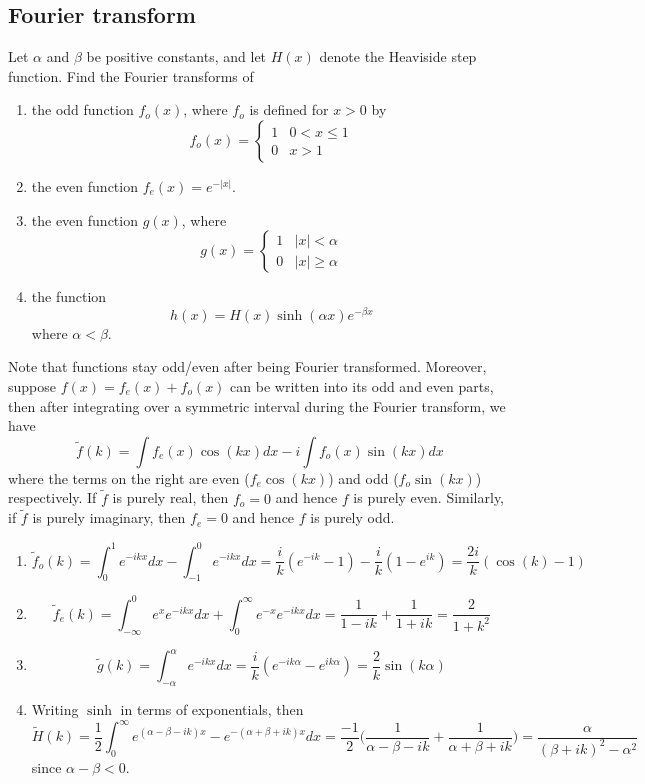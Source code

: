 \documentclass[a4paper]{article}
\begin{document}
\subsection*{Fourier transform}
\begin{qns}
Let $\alpha$ and $\beta$ be positive constants, and let $H(x)$ denote the Heaviside step function. Find the Fourier transforms of 
\begin{enumerate}[label=(\alph*)]
    \item the odd function $f_o(x)$, where $f_o$ is defined for $x>0$ by 
    $$f_o(x)=
\left\{
        \begin{array}{ll}
      1 & 0< x\leq 1 \\
      0 & x>1 
        \end{array}
    \right.$$
    \item the even function $f_e(x)=e^{-|x|}$.
    \item the even function $g(x)$, where
    $$g(x)=
\left\{
        \begin{array}{ll}
      1 & |x|<\alpha \\
      0 & |x|\geq\alpha 
        \end{array}
    \right.$$
    \item the function
    $$h(x)=H(x)\sinh(\alpha x)e^{-\beta x}$$
    where $\alpha<\beta$.
\end{enumerate}
\end{qns}
\begin{ans}
Note that functions stay odd/even after being Fourier transformed. Moreover, suppose $f(x)=f_e(x)+f_o(x)$ can be written into its odd and even parts, then after integrating over a symmetric interval during the Fourier transform, we have
$$\tilde{f}(k)=\int f_e(x)\cos(kx)dx-i\int f_o(x)\sin(kx)dx$$
where the terms on the right are even ($f_e\cos(kx)$) and odd ($f_o\sin(kx)$) respectively. If $\tilde{f}$ is purely real, then $f_o=0$ and hence $f$ is purely even. Similarly, if $\tilde{f}$ is purely imaginary, then $f_e=0$ and hence $f$ is purely odd.
\begin{enumerate}[label=(\alph*)]
\item $$\tilde{f}_o(k)=\int_0^1e^{-ikx}dx-\int_{-1}^0e^{-ikx}dx=\frac{i}{k}(e^{-ik}-1)-\frac{i}{k}(1-e^{ik})=\frac{2i}{k}(\cos(k)-1)$$
\item 
$$\tilde{f}_e(k)=\int_{-\infty}^0e^xe^{-ikx}dx+\int_0^\infty e^{-x}e^{-ikx}dx=\frac{1}{1-ik}+\frac{1}{1+ik}=\frac{2}{1+k^2}$$
\item $$\tilde{g}(k)=\int_{-\alpha}^\alpha e^{-ikx}dx=\frac{i}{k}(e^{-ik\alpha}-e^{ik\alpha})=\frac{2}{k}\sin(k\alpha)$$
\item Writing $\sinh$ in terms of exponentials, then
$$\tilde{H}(k)=\frac{1}{2}\int_0^\infty e^{(\alpha-\beta-ik)x}-e^{-(\alpha+\beta+ik)x}dx=\frac{-1}{2}\bigg(\frac{1}{\alpha-\beta-ik}+\frac{1}{\alpha+\beta+ik}\bigg)=\frac{\alpha}{(\beta+ik)^2-\alpha^2}$$
since $\alpha-\beta<0$.
\end{enumerate}
\end{ans}
\end{document}

